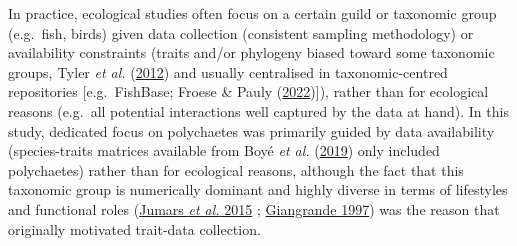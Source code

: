 \documentclass[9pt,biorxiv,doublespacing,lineno]{lapreprint}
\begin{document}
In practice, ecological studies often focus on a certain guild or
taxonomic group (e.g.~fish, birds) given data collection (consistent
sampling methodology) or availability constraints (traits and/or
phylogeny biased toward some taxonomic groups, Tyler \emph{et al.}
(\protect\hyperlink{ref-Tyler_2012}{2012}) and usually centralised in
taxonomic-centred repositories {[}e.g.~FishBase; Froese \& Pauly
(\protect\hyperlink{ref-Froese_2022}{2022}){]}), rather than for
ecological reasons (e.g.~all potential interactions well captured by the
data at hand). In this study, dedicated focus on polychaetes was
primarily guided by data availability (species-traits matrices available
from Boyé \emph{et al.} (\protect\hyperlink{ref-Boye_2019a}{2019}) only
included polychaetes) rather than for ecological reasons, although the
fact that this taxonomic group is numerically dominant and highly
diverse in terms of lifestyles and functional roles
(\protect\hyperlink{ref-Jumars_2015}{Jumars \emph{et al.} 2015} ;
\protect\hyperlink{ref-Giangrande_1997}{Giangrande 1997}) was the reason
that originally motivated trait-data collection.
\end{document}
